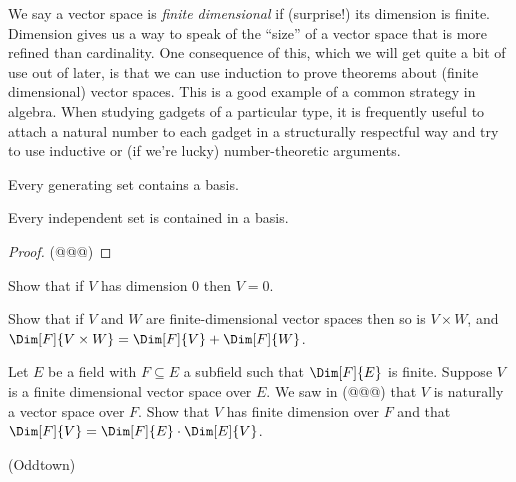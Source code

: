 We say a vector space is \emph{finite dimensional} if (surprise!) its dimension is finite. Dimension gives us a way to speak of the ``size'' of a vector space that is more refined than cardinality. One consequence of this, which we will get quite a bit of use out of later, is that we can use induction to prove theorems about (finite dimensional) vector spaces. This is a good example of a common strategy in algebra. When studying gadgets of a particular type, it is frequently useful to attach a natural number to each gadget in a structurally respectful way and try to use inductive or (if we're lucky) number-theoretic arguments.

\begin{prp}
\begin{enumerate*}
\item Every generating set contains a basis.
\item Every independent set is contained in a basis.
\end{enumerate*}
\end{prp}

\begin{proof}
(@@@)
\end{proof}

\NowForSomeExercises

\begin{exercises}
\item{\label{exr:dim-zero}}
Show that if $V$ has dimension 0 then $V = 0$.

\item{\label{exr:dim-of-product}}
Show that if $V$ and $W$ are finite-dimensional vector spaces then so is $V \times W$, and $\Dim[F]{V \times W} = \Dim[F]{V} + \Dim[F]{W}$.

\item{\label{exr:dim-field-ext}}
Let $E$ be a field with $F \subseteq E$ a subfield such that $\Dim[F]{E}$ is finite. Suppose $V$ is a finite dimensional vector space over $E$. We saw in (@@@) that $V$ is naturally a vector space over $F$. Show that $V$ has finite dimension over $F$ and that $\Dim[F]{V} = \Dim[F]{E} \cdot \Dim[E]{V}$.

\item{\label{exr:oddtown}}
(Oddtown)
\end{exercises}